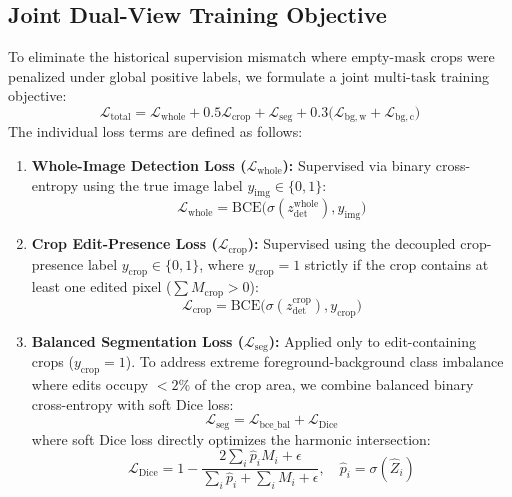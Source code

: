 \subsection{Joint Dual-View Training Objective}
To eliminate the historical supervision mismatch where empty-mask crops were penalized under global positive labels, we formulate a joint multi-task training objective:
\begin{equation}
    \mathcal{L}_{\mathrm{total}} = \mathcal{L}_{\mathrm{whole}} + 0.5 \mathcal{L}_{\mathrm{crop}} + \mathcal{L}_{\mathrm{seg}} + 0.3 \big(\mathcal{L}_{\mathrm{bg,w}} + \mathcal{L}_{\mathrm{bg,c}}\big)
    \label{eq:total_loss}
\end{equation}
The individual loss terms are defined as follows:
\begin{enumerate}
    \item \textbf{Whole-Image Detection Loss ($\mathcal{L}_{\mathrm{whole}}$):} Supervised via binary cross-entropy using the true image label $y_{\mathrm{img}} \in \{0, 1\}$:
    \begin{equation}
        \mathcal{L}_{\mathrm{whole}} = \mathrm{BCE}\big(\sigma(z_{\mathrm{det}}^{\mathrm{whole}}), y_{\mathrm{img}}\big)
    \end{equation}
    \item \textbf{Crop Edit-Presence Loss ($\mathcal{L}_{\mathrm{crop}}$):} Supervised using the decoupled crop-presence label $y_{\mathrm{crop}} \in \{0, 1\}$, where $y_{\mathrm{crop}} = 1$ strictly if the crop contains at least one edited pixel ($\sum M_{\mathrm{crop}} > 0$):
    \begin{equation}
        \mathcal{L}_{\mathrm{crop}} = \mathrm{BCE}\big(\sigma(z_{\mathrm{det}}^{\mathrm{crop}}), y_{\mathrm{crop}}\big)
    \end{equation}
    \item \textbf{Balanced Segmentation Loss ($\mathcal{L}_{\mathrm{seg}}$):} Applied only to edit-containing crops ($y_{\mathrm{crop}} = 1$). To address extreme foreground-background class imbalance where edits occupy $<2\%$ of the crop area, we combine balanced binary cross-entropy with soft Dice loss:
    \begin{equation}
        \mathcal{L}_{\mathrm{seg}} = \mathcal{L}_{\mathrm{bce\_bal}} + \mathcal{L}_{\mathrm{Dice}}
    \end{equation}
    where soft Dice loss directly optimizes the harmonic intersection:
    \begin{equation}
        \mathcal{L}_{\mathrm{Dice}} = 1 - \frac{2 \sum_{i} \hat{p}_i M_i + \epsilon}{\sum_{i} \hat{p}_i + \sum_{i} M_i + \epsilon}, \quad \hat{p}_i = \sigma(\hat{Z}_i)

\end{equation}
\end{enumerate}
